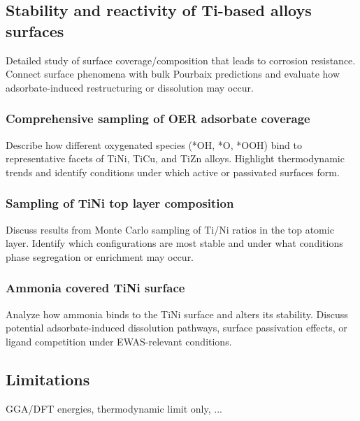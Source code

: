 \documentclass[journal=jacsat,manuscript=article]{achemso}
\begin{document}
\subsection{Stability and reactivity of Ti-based alloys surfaces}
Detailed study of surface coverage/composition that leads to corrosion resistance. Connect surface phenomena with bulk Pourbaix predictions and evaluate how adsorbate-induced restructuring or dissolution may occur.

\subsubsection{Comprehensive sampling of OER adsorbate coverage}
Describe how different oxygenated species (*OH, *O, *OOH) bind to representative facets of TiNi, TiCu, and TiZn alloys. Highlight thermodynamic trends and identify conditions under which active or passivated surfaces form.

\subsubsection{Sampling of TiNi top layer composition}
Discuss results from Monte Carlo sampling of Ti/Ni ratios in the top atomic layer. Identify which configurations are most stable and under what conditions phase segregation or enrichment may occur.

\subsubsection{Ammonia covered TiNi surface}
Analyze how ammonia binds to the TiNi surface and alters its stability. Discuss potential adsorbate-induced dissolution pathways, surface passivation effects, or ligand competition under EWAS-relevant conditions.



\subsection{Limitations}
GGA/DFT energies, thermodynamic limit only, ...
\end{document}
